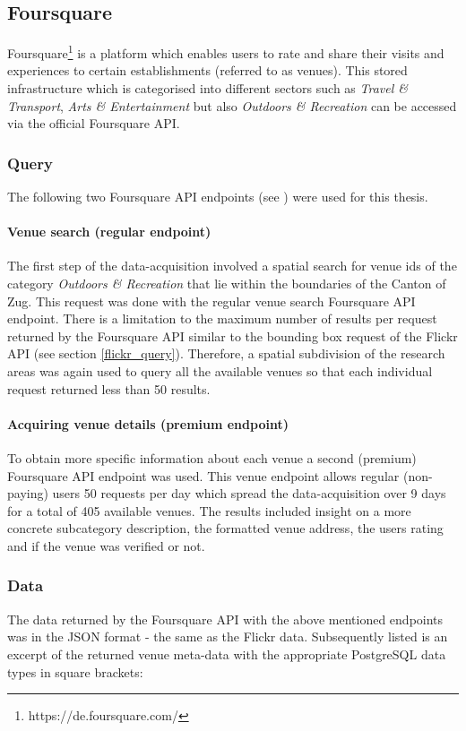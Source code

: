 \subsection{Foursquare} \label{foursquare}
Foursquare\footnote{https://de.foursquare.com/} is a platform which enables users to rate and share their visits and experiences to certain establishments (referred to as venues). This stored infrastructure which is categorised into different sectors such as \textit{Travel \& Transport}, \textit{Arts \& Entertainment} but also \textit{Outdoors \& Recreation} can be accessed via the official Foursquare API.

\subsubsection{Query} \label{foursquare_query}
The following two Foursquare API endpoints (see ) were used for this thesis.
\paragraph*{Venue search (regular endpoint)} \label{foursquare_endpoint1}
The first step of the data-acquisition involved a spatial search for venue ids of the category \textit{Outdoors \& Recreation} that lie within the boundaries of the Canton of Zug. This request was done with the regular venue search Foursquare API endpoint. There is a limitation to the maximum number of results per request returned by the Foursquare API similar to the bounding box request of the Flickr API (see section \ref{flickr_query}). Therefore, a spatial subdivision of the research areas was again used to query all the available venues so that each individual request returned less than 50 results.

\paragraph*{Acquiring venue details (premium endpoint)} \label{foursquare_endpoint2}
To obtain more specific information about each venue a second (premium) Foursquare API endpoint was used. This venue endpoint allows regular (non-paying) users 50 requests per day which spread the data-acquisition over 9 days for a total of 405 available venues. The results included insight on a more concrete subcategory description, the formatted venue address, the users rating and if the venue was verified or not.

\subsubsection{Data} \label{fq_data}
The data returned by the Foursquare API with the above mentioned endpoints was in the JSON format - the same as the Flickr data.
Subsequently listed is an excerpt of the returned venue meta-data with the appropriate PostgreSQL data types in square brackets: \\

